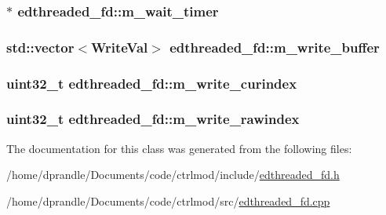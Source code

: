 \hypertarget{classedthreaded__fd_ae1244377b4ee3faf7f4cb9e21afadba6}{
\subsubsection[{m\-\_\-wait\-\_\-timer}]{$\ast$ edthreaded\-\_\-fd\-::m\-\_\-wait\-\_\-timer\hspace{0.3cm}{\ttfamily [protected]}}}\label{classedthreaded__fd_ae1244377b4ee3faf7f4cb9e21afadba6}
\hypertarget{classedthreaded__fd_aeaba4592ba02680a1d8653479f0d1d87}{
\subsubsection[{m\-\_\-write\-\_\-buffer}]{\setlength{\rightskip}{0pt plus 5cm}std\-::vector$<${\bf Write\-Val}$>$ edthreaded\-\_\-fd\-::m\-\_\-write\-\_\-buffer\hspace{0.3cm}{\ttfamily [protected]}}}\label{classedthreaded__fd_aeaba4592ba02680a1d8653479f0d1d87}
\hypertarget{classedthreaded__fd_a318812ed9af58952dc87849634145e91}{
\subsubsection[{m\-\_\-write\-\_\-curindex}]{\setlength{\rightskip}{0pt plus 5cm}uint32\-\_\-t edthreaded\-\_\-fd\-::m\-\_\-write\-\_\-curindex\hspace{0.3cm}{\ttfamily [protected]}}}\label{classedthreaded__fd_a318812ed9af58952dc87849634145e91}
\hypertarget{classedthreaded__fd_a5e31d54e745a41467270d2e8facef9f6}{
\subsubsection[{m\-\_\-write\-\_\-rawindex}]{\setlength{\rightskip}{0pt plus 5cm}uint32\-\_\-t edthreaded\-\_\-fd\-::m\-\_\-write\-\_\-rawindex\hspace{0.3cm}{\ttfamily [protected]}}}\label{classedthreaded__fd_a5e31d54e745a41467270d2e8facef9f6}


The documentation for this class was generated from the following files\-:\begin{DoxyCompactItemize}
\item 
/home/dprandle/\-Documents/code/ctrlmod/include/\hyperlink{edthreaded__fd_8h}{edthreaded\-\_\-fd.\-h}\item 
/home/dprandle/\-Documents/code/ctrlmod/src/\hyperlink{edthreaded__fd_8cpp}{edthreaded\-\_\-fd.\-cpp}\end{DoxyCompactItemize}
